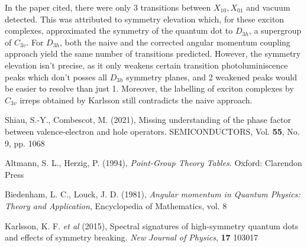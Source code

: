 \documentclass[12pt]{article}
\begin{document}
	In the paper cited, there were only 3 transitions between $X_{10},X_{01}$ and vacuum detected. This was attributed to symmetry elevation which, for these exciton complexes, approximated the symmetry of the quantum dot to $D_{3h}$, a supergroup of $C_{3v}$. For $D_{3h}$, both the naive and the corrected angular momentum coupling approach yield the same number of transitions predicted. However, the symmetry elevation isn't precise, as it only weakens certain transition photoluminiscence peaks which don't posses all $D_{3h}$ symmetry planes, and 2 weakened peaks would be easier to resolve than just 1. Moreover, the labelling of exciton complexes by $C_{3v}$ irreps obtained by Karlsson still contradicts the naive approach.
	
\begin{thebibliography}{10}

Shiau, S.-Y., Combescot, M. (2021), Missing understanding of the phase factor between valence-electron and hole operators. SEMICONDUCTORS, Vol. \textbf{55}, No. 9, pp. 1068

Altmann, S. L., Herzig, P. (1994), \textit{Point-Group Theory Tables}. Oxford: Clarendon Press

Biedenham, L. C., Louck, J. D. (1981), \textit{Angular momentum in Quantum Physics: Theory and Application}, Encyclopedia of Mathematics, vol. 8

Karlsson, K. F. \textit{et al} (2015), Spectral signatures of high-symmetry quantum dots and effects of symmetry breaking. \textit{New Journal of Physics}, \textbf{17} 103017


\end{thebibliography}	
	
\end{document}
